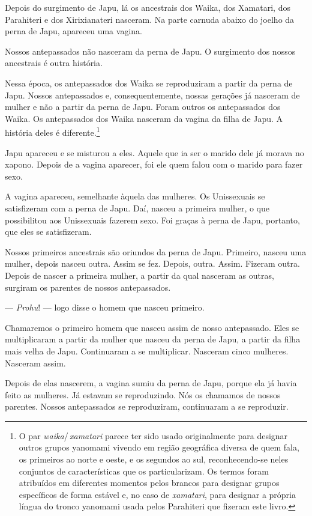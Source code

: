 Depois do surgimento de Japu, lá os ancestrais dos Waika, dos Xamatari,
dos Parahiteri e dos Xirixianateri nasceram. Na parte carnuda abaixo do
joelho da perna de Japu, apareceu uma vagina. 

Nossos antepassados não nasceram da perna de Japu. O surgimento dos
nossos ancestrais é outra história. 

Nessa época, os antepassados dos Waika se reproduziram a partir da
perna de Japu. Nossos antepassados e, consequentemente, nossas gerações
já nasceram de mulher e não a partir da perna de Japu. Foram outros
os antepassados dos Waika. Os antepassados dos Waika nasceram da vagina da
filha de Japu. A história deles é diferente.\footnote{O par \textit{waika}/\,\textit{xamatari} parece ter sido usado originalmente para designar outros grupos yanomami vivendo em região geográfica diversa de quem fala, os primeiros ao norte e oeste, e os segundos ao sul, reconhecendo-se neles conjuntos de características que os particularizam. Os termos foram atribuídos em diferentes momentos pelos brancos para designar grupos específicos de forma estável e, no caso de \textit{xamatari}, para designar a própria língua do tronco yanomami usada pelos Parahiteri que fizeram este livro.} 

Japu apareceu e se misturou a eles. Aquele que ia ser o marido
dele já morava no xapono. Depois de a vagina aparecer, foi ele quem
falou com o marido para fazer sexo. 

A vagina apareceu, semelhante àquela das mulheres. Os Unissexuais se
satisfizeram com a perna de Japu. Daí, nasceu a primeira mulher, o que
possibilitou aos Unissexuais fazerem sexo. Foi graças à perna de Japu, portanto,
que eles se satisfizeram. 

Nossos primeiros ancestrais são oriundos da perna de Japu. Primeiro,
nasceu uma mulher, depois nasceu outra. Assim se fez. Depois, outra.
Assim. Fizeram outra. Depois de nascer a primeira mulher, a partir da
qual nasceram as outras, surgiram os parentes de nossos antepassados. 

--- \textit{Prohu}! --- logo disse o homem que nasceu primeiro. 

Chamaremos o primeiro homem que nasceu assim de nosso antepassado.
Eles se multiplicaram a partir da mulher que nasceu da perna de Japu, a
partir da filha mais velha de Japu. Continuaram a se multiplicar.
Nasceram cinco mulheres. Nasceram assim. 

Depois de elas nascerem, a vagina sumiu da perna de Japu, porque ela já
havia feito as mulheres. Já estavam se reproduzindo. Nós os chamamos de
nossos parentes. Nossos antepassados se reproduziram, continuaram a se
reproduzir. 

